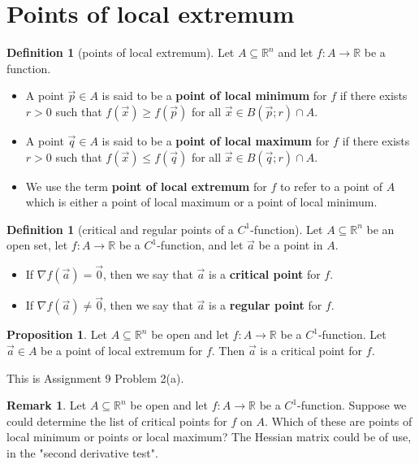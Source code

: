 \documentclass[11pt]{article}
\makeatletter
\theoremstyle{definition}
\newtheorem{defn}[thm]{Definition}
\newtheorem{prop}[thm]{Proposition}
\newtheorem{remark}[thm]{Remark}
\newcommand{\R}{\ensuremath{\mathbb{R}}}
\newenvironment{pf}[1][\proofname]{\par
  \pushQED{\qed}%
  \normalfont \topsep0\p@\relax
  \trivlist
  \item[\hskip\labelsep\itshape
  #1\@addpunct{.}]\ignorespaces
}{%
  \popQED\endtrivlist\@endpefalse
}
\makeatother
\begin{document}
\newpage
{}
\section{Points of local extremum}

\begin{defn}[points of local extremum]
Let $A \subseteq \R^n$ and let $f: A \to \R$ be a function.\vspace{-1.5ex}
\begin{itemize}
    \item A point $\vec{p} \in A$ is said to be a {\bf point of local minimum} for $f$ if there exists $r > 0$ such that $f(\vec{x}) \geq f(\vec{p})$ for all $\vec{x} \in B(\vec{p}; r) \cap A$.
    \item A point $\vec{q} \in A$ is said to be a {\bf point of local maximum} for $f$ if there exists $r > 0$ such that $f(\vec{x}) \leq f(\vec{q})$ for all $\vec{x} \in B(\vec{q}; r) \cap A$.
    \item We use the term {\bf point of local extremum} for $f$ to refer to a point of $A$ which is either a point of local maximum or a point of local minimum.
\end{itemize}
\end{defn}

\begin{defn}[critical and regular points of a $C^1$-function]
Let $A \subseteq \R^n$ be an open set, let $f : A \to \R$ be a $C^1$-function, and let $\vec{a}$ be a point in $A$.\vspace{-1.5ex}
\begin{itemize}
    \item If $\nabla f(\vec{a}) = \vec{0}$, then we say that $\vec{a}$ is a {\bf critical point} for $f$.
    \item If $\nabla f(\vec{a}) \neq \vec{0}$, then we say that $\vec{a}$ is a {\bf regular point} for $f$.
\end{itemize}
\end{defn}

\begin{prop}
Let $A \subseteq \R^n$ be open and let $f : A \to \R$ be a $C^1$-function. Let $\vec{a} \in A$ be a point of local extremum for $f$. Then $\vec{a}$ is a critical point for $f$.
\begin{pf}
This is Assignment 9 Problem 2(a).
\end{pf}
\end{prop}

\begin{remark}
Let $A \subseteq \R^n$ be open and let $f : A \to \R$ be a $C^1$-function. Suppose we could determine the list of critical points for $f$ on $A$. Which of these are points of local minimum or points or local maximum? The Hessian matrix could be of use, in the "second derivative test".
\end{remark}
\end{document}
